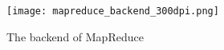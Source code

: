 \documentclass[conference]{IEEEtran}
\begin{document}
%




\begin{figure}
\centering
\texttt{[image: mapreduce\_backend\_300dpi.png]}
\caption{The backend of MapReduce}
\label{fig:backend_of_mr}
\end{figure}
\end{document}
